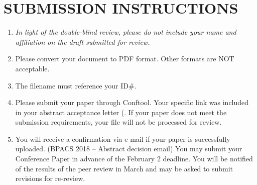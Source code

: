 \section{SUBMISSION INSTRUCTIONS}
\begin{enumerate}
\item
{\it In light of the double-blind review, please do not include your name and affiliation on the draft submitted for review.}
\item
Please convert your document to PDF format. Other formats are NOT acceptable.
\item
The filename must reference your ID\#. 
\item
Please submit your paper through Conftool. Your specific link was included in your abstract acceptance letter (.  If your paper does not meet the submission requirements, your file will not be processed for review. 
\item 
You will receive a confirmation via e-mail if your paper is successfully uploaded. (BPACS 2018 -- Abstract decision email) You may submit your Conference Paper in advance of the February 2 deadline. You will be notified of the results of the peer review in March and may be asked to submit revisions for re-review.
\end{enumerate}